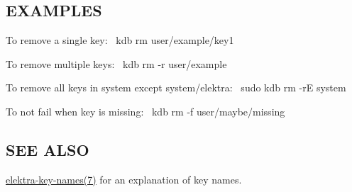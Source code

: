 \subsection*{E\+X\+A\+M\+P\+L\+ES}

To remove a single key\+:~\newline
 {\ttfamily kdb rm user/example/key1}

To remove multiple keys\+:~\newline
 {\ttfamily kdb rm -\/r user/example}

To remove all keys in {\ttfamily system} except {\ttfamily system/elektra}\+:~\newline
 {\ttfamily sudo kdb rm -\/rE system}

To not fail when key is missing\+:~\newline
 {\ttfamily kdb rm -\/f user/maybe/missing}

\subsection*{S\+EE A\+L\+SO}


\begin{DoxyItemize}
\item \hyperlink{doc_help_elektra-key-names_md}{elektra-\/key-\/names(7)} for an explanation of key names. 
\end{DoxyItemize}